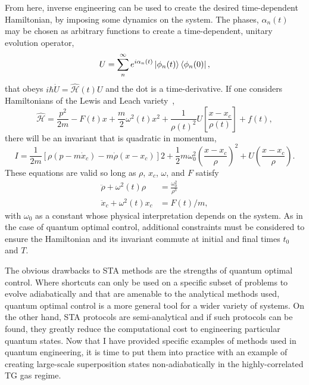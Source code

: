 From here, inverse engineering can be used to create the desired time-dependent Hamiltonian, by imposing some dynamics on the system.
The phases, $\alpha_n(t)$ may be chosen as arbitrary functions to create a time-dependent, unitary evolution operator,
\begin{equation}
U = \sum_n^\infty e^{i\alpha_n(t)}\ket{\phi_n(t)}\bra{\phi_n(0)},
\end{equation}
\noindent that obeys $i\hbar \dot U = \mathcal{\hat H}(t)U$ and the dot is a time-derivative.
If one considers Hamiltonians of the Lewis and Leach variety~\cite{lewis1982},
\begin{equation}
\mathcal{\hat H} = \frac{p^2}{2m}  -F(t)x + \frac{m}{2}\omega^2(t)x^2 + \frac{1}{\rho(t)^2}U\left[\frac{x-x_c}{\rho(t)}\right] + f(t),
\label{eqn:HSTA}
\end{equation}
there will be an invariant that is quadratic in momentum,
\begin{equation}
I = \frac{1}{2m}[\rho(p-m\dot x_c)-m\dot \rho(x-x_c)]2 + \frac{1}{2}m\omega_0^2\left( \frac{x-x_c}{\rho} \right)^2 + U\left( \frac{x-x_c}{\rho}\right).
\end{equation}
\noindent These equations are valid so long as $\rho$, $x_c$, $\omega$, and $F$ satisfy
\begin{align}
\ddot \rho + \omega^2(t)\rho &= \frac{\omega_0^2}{\rho^3} \label{eqn:rho}\\
\ddot x_c + \omega^2(t)x_c &= F(t)/m \label{eqn:xc},
\end{align}
\noindent with $\omega_0$ as a constant whose physical interpretation depends on the system.
As in the case of quantum optimal control, additional constraints must be considered to ensure the Hamiltonian and its invariant commute at initial and final times $t_0$ and $T$.

The obvious drawbacks to STA methods are the strengths of quantum optimal control.
Where shortcuts can only be used on a specific subset of problems to evolve adiabatically and that are amenable to the analytical methods used, quantum optimal control is a more general tool for a wider variety of systems.
On the other hand, STA protocols are semi-analytical and if such protocols can be found, they greatly reduce the computational cost to engineering particular quantum states.
Now that I have provided specific examples of methods used in quantum engineering, it is time to put them into practice with an example of creating large-scale superposition states non-adiabatically in the highly-correlated TG gas regime.


